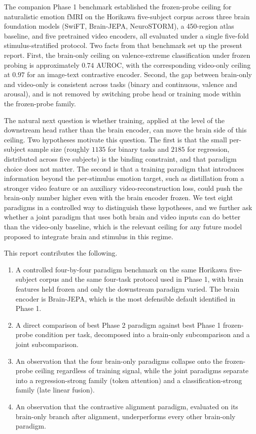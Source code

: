 \documentclass[11pt, a4paper]{article}
\begin{document}
The companion Phase 1 benchmark established the frozen-probe ceiling for naturalistic
emotion fMRI on the Horikawa five-subject corpus across three brain foundation models
(SwiFT, Brain-JEPA, NeuroSTORM), a 450-region atlas baseline, and five pretrained video
encoders, all evaluated under a single five-fold stimulus-stratified protocol. Two facts
from that benchmark set up the present report. First, the brain-only ceiling on
valence-extreme classification under frozen probing is approximately $0.74$ AUROC, with
the corresponding video-only ceiling at $0.97$ for an image-text contrastive encoder.
Second, the gap between brain-only and video-only is consistent across tasks (binary and
continuous, valence and arousal), and is not removed by switching probe head or training
mode within the frozen-probe family.

The natural next question is whether training, applied at the level of the downstream
head rather than the brain encoder, can move the brain side of this ceiling. Two
hypotheses motivate this question. The first is that the small per-subject sample size
(roughly $1135$ for binary tasks and $2185$ for regression, distributed across five
subjects) is the binding constraint, and that paradigm choice does not matter. The second
is that a training paradigm that introduces information beyond the per-stimulus emotion
target, such as distillation from a stronger video feature or an auxiliary
video-reconstruction loss, could push the brain-only number higher even with the brain
encoder frozen. We test eight paradigms in a controlled way to distinguish these
hypotheses, and we further ask whether a joint paradigm that uses both brain and video
inputs can do better than the video-only baseline, which is the relevant ceiling for any
future model proposed to integrate brain and stimulus in this regime.

This report contributes the following.

\begin{enumerate}[leftmargin=1.4em, itemsep=2pt]
  \item A controlled four-by-four paradigm benchmark on the same Horikawa five-subject
        corpus and the same four-task protocol used in Phase 1, with brain features held
        frozen and only the downstream paradigm varied. The brain encoder is Brain-JEPA,
        which is the most defensible default identified in Phase 1.
  \item A direct comparison of best Phase 2 paradigm against best Phase 1 frozen-probe
        condition per task, decomposed into a brain-only subcomparison and a joint
        subcomparison.
  \item An observation that the four brain-only paradigms collapse onto the frozen-probe
        ceiling regardless of training signal, while the joint paradigms separate into a
        regression-strong family (token attention) and a classification-strong family
        (late linear fusion).
  \item An observation that the contrastive alignment paradigm, evaluated on its
        brain-only branch after alignment, underperforms every other brain-only paradigm.
\end{enumerate}
\end{document}
